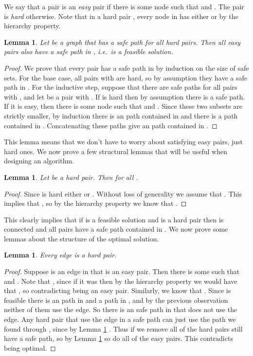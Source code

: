 \documentclass[11pt,letterpaper]{article}
\newtheorem{lemma}[theorem]{Lemma}
\theoremstyle{definition}
\begin{document}
We say that a pair  is an \emph{easy} pair if there is some
node  such that  and .  The pair  is \emph{hard} otherwise.  Note
that in a hard pair , every node  in  has either
 or  by the hierarchy property.

\begin{lemma} \label{lem:hierarchy_easy}
  Let  be a graph that has a safe path for all hard pairs.  Then
  all easy pairs also have a safe path in , i.e.\  is a feasible
  solution.
\end{lemma}
\begin{proof}
  We prove that every pair  has a safe path in  by
  induction on the size of safe sets.  For the base case, all pairs
   with  are hard, so by assumption they have a
  safe path in .  For the inductive step, suppose that there are
  safe paths for all pairs  with , and let
   be a pair with .  If  is hard then
  by assumption there is a safe path.  If it is easy, then there is
  some node  such that  and
  .  Since these two subsets are strictly
  smaller, by induction there is an  path contained in  and there is a  path contained in .  Concatenating these paths give an  path
  contained in .
\end{proof}


This lemma means that we don't have to worry about satisfying easy
pairs, just hard ones.  We now prove a few structural lemmas that will be useful when designing an algorithm.


\begin{lemma} \label{lem:hierarchy_strong_containment} Let 
  be a hard pair.  Then  for all .
\end{lemma}
\begin{proof}
  Since  is hard either  or .  Without loss of generality we assume that .  This implies that , so by the hierarchy
  property we know that .
\end{proof}

This clearly implies that if  is a feasible solution and 
is a hard pair then  is connected and all pairs  have a safe path contained in .  We now prove some
lemmas about the structure of the optimal solution.

\begin{lemma} \label{lem:hierarchy_OPT_hard}
  Every edge  is a hard pair.
\end{lemma}
\begin{proof}
  Suppose  is an edge in  that is an easy pair.  Then
  there is some  such that  and
  .  Note that , since if it
  was then by the hierarchy property we would have that , so  contradicting 
  being an easy pair.  Similarly, we know that .
  Since  is feasible there is an  path in  and a  path in , and by the
  previous observation neither of them use the  edge.  So
  there is an  safe path in  that does not use the 
  edge.  Any hard pair  that use the  edge in a safe
  path can just use the path we found through , since by Lemma
  \ref{lem:hierarchy_strong_containment} .
  Thus if we remove  all of the hard pairs still have a safe
  path, so by Lemma \ref{lem:hierarchy_easy} so do all of the easy
  pairs.  This contradicts  being optimal.
\end{proof}
\end{document}
